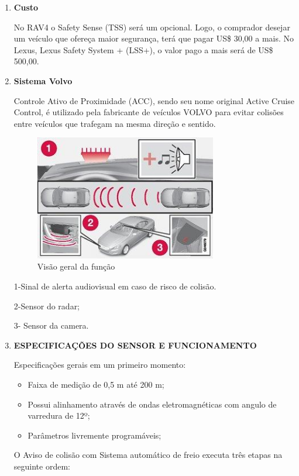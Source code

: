 \begin{enumerate}
\item \textbf{Custo}

  No RAV4 o Safety Sense (TSS) será um opcional. Logo, o comprador desejar um
  veículo que ofereça maior segurança, terá que pagar US\$ 30,00 a mais. No
  Lexus,  Lexus Safety System + (LSS+), o valor pago a mais será de US\$
  500,00.  \cite{1comper}

\item \textbf{Sistema Volvo}

Controle Ativo de Proximidade (ACC), sendo seu nome original Active Cruise
Control, é utilizado pela fabricante de veículos VOLVO para evitar colisões
entre veículos que trafegam na mesma direção e sentido.

\begin{figure}[h]
  \centering
  \includegraphics[width=300px, scale=1]{figuras/esquematico_volvo}
  \caption{Visão geral da função \cite{8comper}}
\label{fig:esquematico_volvo}
\end{figure}

1-Sinal de alerta audiovisual em caso de risco de colisão.

2-Sensor do radar;

3- Sensor da camera.

\item \textbf{ESPECIFICAÇÕES DO SENSOR E FUNCIONAMENTO}

Especificações gerais em um primeiro momento:

\begin{itemize}
  \item Faixa de medição de 0,5 m até 200 m;
  \item Possui alinhamento através de ondas eletromagnéticas com angulo de varredura de 12º;
  \item Parâmetros livremente programáveis;
\end{itemize}

O Aviso de colisão com Sistema automático de freio executa três etapas na seguinte ordem:


\end{enumerate}
